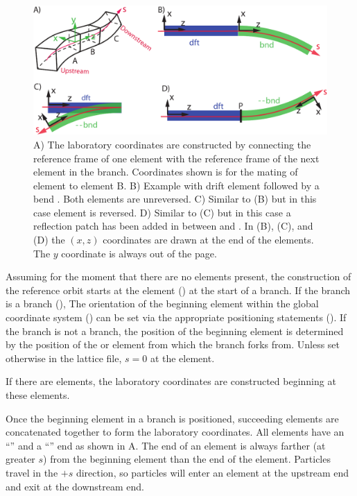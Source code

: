 \begin{figure}[tb]
  \centering
  \includegraphics[width=5in]{patch-between.pdf}
  \caption[Laboratory coordinates construction.]{A) The laboratory coordinates are constructed by
connecting the  reference frame of one element with the  reference frame
of the next element in the branch. Coordinates shown is for the mating of element  to element
{B}.  B) Example with drift element  followed by a bend . Both elements are
unreversed. C) Similar to (B) but in this case element  is reversed.  D) Similar to (C) but
in this case a reflection patch has been added in between  and .  In (B), (C), and
(D) the $(x,z)$ coordinates are drawn at the  end of the elements. The $y$ coordinate
is always out of the page.}
  \label{f:patch.between}
\end{figure}

Assuming for the moment that there are no  elements present, the construction of the
reference orbit starts at the  element () at the start of a
branch. If the branch is a  branch (), The orientation of the beginning
element within the global coordinate system () can be set via the appropriate
positioning statements (). If the branch is not a  branch, the position
of the beginning element is determined by the position of the  or  element
from which the branch forks from. Unless set otherwise in the lattice file, $s = 0$ at the
 element.

If there are  elements, the laboratory coordinates are constructed beginning at these
elements.

Once the beginning element in a branch is positioned, succeeding elements are concatenated together
to form the laboratory coordinates. All elements have an ``'' and a ``''
end as shown in A. The  end of an element is always farther (at
greater $s$) from the beginning element than the  end of the element.  Particles travel
in the $+s$ direction, so particles will enter an element at the upstream end and exit at the
downstream end.

